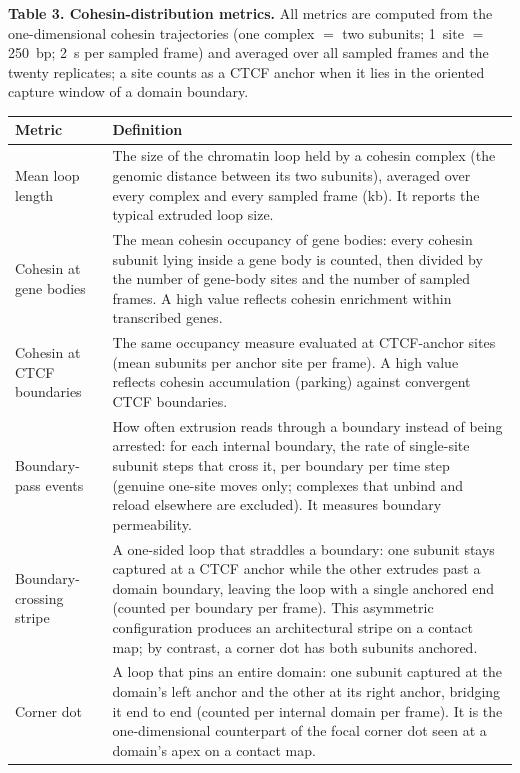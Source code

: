 \documentclass[11pt]{article}
\begin{document}
\medskip
\noindent\textbf{Table 3. Cohesin-distribution metrics.} All metrics are computed from the
one-dimensional cohesin trajectories (one complex $=$ two subunits; 1~site $=$ 250~bp; 2~s per
sampled frame) and averaged over all sampled frames and the twenty replicates; a site counts
as a CTCF anchor when it lies in the oriented capture window of a domain boundary.

\medskip
\noindent\begin{tabularx}{\linewidth}{@{}>{\raggedright\arraybackslash}p{3.3cm} Y@{}}
\toprule
Metric & Definition \\
\midrule
Mean loop length & The size of the chromatin loop held by a cohesin complex (the genomic
distance between its two subunits), averaged over every complex and every sampled frame (kb).
It reports the typical extruded loop size. \\
Cohesin at gene bodies & The mean cohesin occupancy of gene bodies: every cohesin subunit lying
inside a gene body is counted, then divided by the number of gene-body sites and the number of
sampled frames. A high value reflects cohesin enrichment within transcribed genes. \\
Cohesin at CTCF boundaries & The same occupancy measure evaluated at CTCF-anchor sites (mean
subunits per anchor site per frame). A high value reflects cohesin accumulation (parking)
against convergent CTCF boundaries. \\
Boundary-pass events & How often extrusion reads through a boundary instead of being arrested:
for each internal boundary, the rate of single-site subunit steps that cross it, per boundary per
time step (genuine one-site moves only; complexes that unbind and reload elsewhere are excluded).
It measures boundary permeability. \\
Boundary-crossing stripe & A one-sided loop that straddles a boundary: one subunit stays captured
at a CTCF anchor while the other extrudes past a domain boundary, leaving the loop with a single
anchored end (counted per boundary per frame). This asymmetric configuration produces an
architectural stripe on a contact map; by contrast, a corner dot has both subunits anchored. \\
Corner dot & A loop that pins an entire domain: one subunit captured at the domain's left anchor
and the other at its right anchor, bridging it end to end (counted per internal domain per frame).
It is the one-dimensional counterpart of the focal corner dot seen at a domain's apex on a
contact map. \\
\bottomrule
\end{tabularx}
\end{document}
